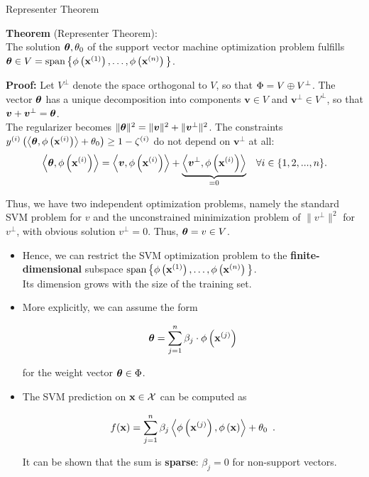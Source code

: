 \documentclass[11pt,compress,t,notes=noshow, xcolor=table]{beamer}
\begin{document}
\begin{vbframe}{Representer Theorem}

  \textbf{Theorem} (Representer Theorem):\\
  The solution $\bm{\theta}, \theta_0$ of the support vector machine optimization problem fulfills $\bm{\theta} \in V = \operatorname{span}\big\{\phi\left(\mathbf{x}^{(1)}\right), \dots, \phi\left(\mathbf{x}^{(n)}\right)\big\}$.\\

  \vspace*{0.2cm}

  \begin{footnotesize}
  \textbf{Proof:} Let $V^\perp$ denote the space orthogonal to $V$,
  so that $\Phi = V \oplus V^\perp$. The vector $\bm{\theta}$ has a
  unique decomposition into components $\bm{v} \in V$ and $\bm{v} ^\perp \in V^\perp$,
  so that $\bm{v}  + \bm{v} ^\perp = \bm{\theta}$.\\[0.5em]

  The regularizer becomes $\|\bm{\theta}\|^2 = \|\bm{v} \|^2 + \|\bm{v} ^\perp\|^2$.
  The constraints $y^{(i)}  \left( \left\langle \bm{\theta}, \phi\left(\mathbf{x}^{(i)}\right) \right\rangle + \theta_0\right) \geq 1 - \zeta^{(i)}$
  do not depend on $\bm{v} ^\perp$ at all:
  $$
    \left\langle \bm{\theta}, \phi\left(\mathbf{x}^{(i)}\right) \right\rangle = \left\langle \bm{v} , \phi\left(\mathbf{x}^{(i)}\right) \right\rangle + \underbrace{\left\langle \bm{v}^\perp, \phi\left(\mathbf{x}^{(i)} \right) \right\rangle}_{= 0}
    \enspace ~ \forall i \in \{1, 2, ..., n\}.
  $$

  Thus, we have two independent optimization problems, namely the
  standard SVM problem for $v$ and the unconstrained minimization
  problem of $\|v^\perp\|^2$ for $v^\perp$, with obvious solution
  $v^\perp = 0$. Thus, $\bm{\theta} = v \in V$.
  \end{footnotesize}

  \framebreak

  \begin{itemize}
    \item Hence, we can restrict the SVM optimization problem
    to the \textbf{finite-dimensional} subspace
    $\operatorname{span}\big\{\phi\left(\mathbf{x}^{(1)}\right), \dots, \phi\left(\mathbf{x}^{(n)}\right)\big\}$.\\
    Its dimension grows with the size of the
    training set.
    \item More explicitly, we can assume the form
    \begin{footnotesize}
    $$ \bm{\theta} = \sum_{j=1}^n \beta_j \cdot \phi\left(\mathbf{x}^{(j)}\right) $$
    \end{footnotesize}
    for the weight vector $\bm{\theta}\in \Phi$.
      \item The SVM prediction on $\mathbf{x} \in \mathcal{X}$ can be computed as
    \begin{footnotesize}
    $$
    f(\mathbf{x}) = \sum_{j = 1}^n \beta_j \left\langle \phi\left(\mathbf{x}^{(j)}\right), \phi\left(\mathbf{x}\right) \right\rangle + \theta_0
    \enspace.
    $$
    \end{footnotesize}


    It can be shown that the sum is \textbf{sparse}: $\beta_j = 0$ for non-support vectors.

  \end{itemize}

\end{vbframe}

\endlecture
\end{document}
